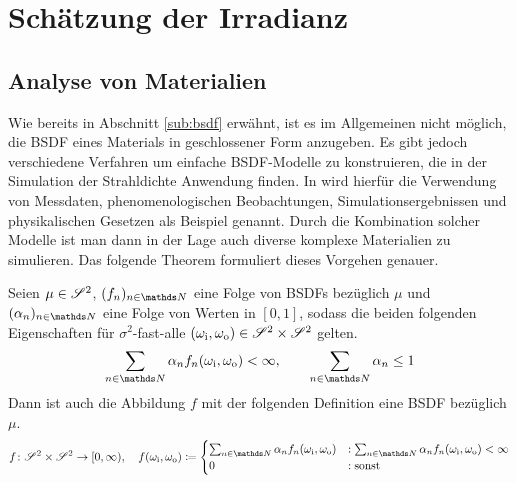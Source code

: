 \section{Schätzung der Irradianz} %
\label{sec:schätzung_der_irradianz}



	\subsection{Analyse von Materialien} %
	\label{sub:analyse_von_materialien}

		Wie bereits in Abschnitt \ref{sub:bsdf} erwähnt, ist es im Allgemeinen nicht möglich, die BSDF eines Materials in geschlossener Form anzugeben.
		Es gibt jedoch verschiedene Verfahren um einfache BSDF-Modelle zu konstruieren, die in der Simulation der Strahldichte Anwendung finden.
		In \cite[S.~507~f]{pbrt3} wird hierfür die Verwendung von Messdaten, phenomenologischen Beobachtungen, Simulationsergebnissen und physikalischen Gesetzen als Beispiel genannt.
		Durch die Kombination solcher Modelle ist man dann in der Lage auch diverse komplexe Materialien zu simulieren.
		Das folgende Theorem formuliert dieses Vorgehen genauer.
		\begin{theorem*}
			Seien $\mu\in\mathscr{S}^{2}$, $(f_n)_{n\in\SN}$ eine Folge von BSDFs bezüglich $\mu$ und $(\alpha_n)_{n\in\SN}$ eine Folge von Werten in $[0,1]$, sodass die beiden folgenden Eigenschaften für $\sigma^2$-fast-alle $(\omega_{\mathrm{i}},\omega_{\mathrm{o}})\in\mathscr{S}^{2}\times\mathscr{S}^{2}$ gelten.
			\[
				\sum_{n\in\SN}\alpha_n f_n(\omega_\m{i},\omega_\m{o}) < \infty ,\qquad \sum_{n\in\SN}\alpha_n \leq 1
			\]
			Dann ist auch die Abbildung $f$ mit der folgenden Definition eine BSDF bezüglich $\mu$.
			\[
				\func{f}{\ssp\times\ssp}{[0,\infty)},\quad f(\omega_\m{i},\omega_\m{o})\define
				\begin{cases}
					\sum_{n\in\SN}\alpha_n f_n(\omega_\m{i},\omega_\m{o}) &: \sum_{n\in\SN}\alpha_n f_n(\omega_\m{i},\omega_\m{o}) < \infty \\
					0 &: \m{sonst}
				\end{cases}
			\]
		\end{theorem*}
